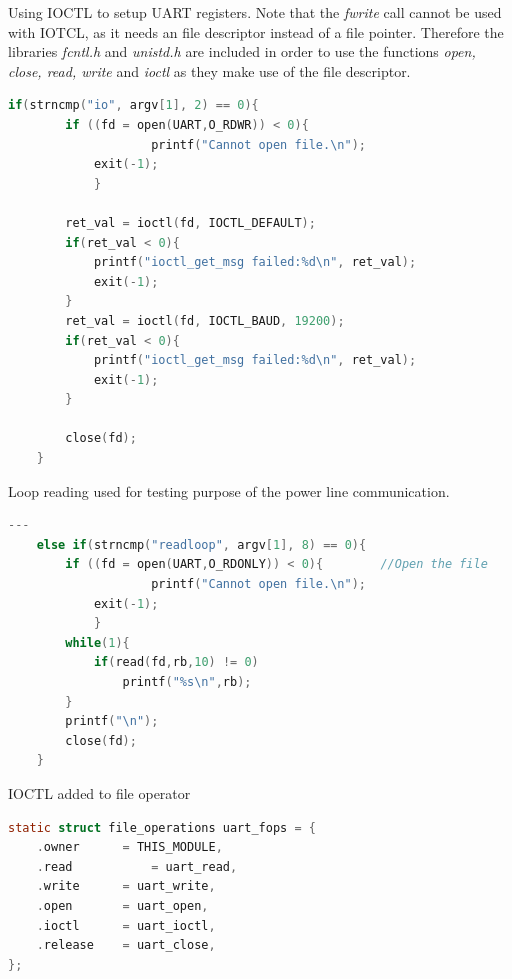 Using IOCTL to setup UART registers. Note that the \textit{fwrite} call cannot be used with IOTCL, as it needs an file descriptor instead of a file pointer. Therefore the libraries \textit{fcntl.h} and \textit{unistd.h} are included in order to use the functions \textit{open, close, read, write} and \textit{ioctl} as they make use of the file descriptor. 
\begin{lstlisting}[language=c]
	if(strncmp("io", argv[1], 2) == 0){
		if ((fd = open(UART,O_RDWR)) < 0){
     	          	printf("Cannot open file.\n");
			exit(-1);
        	}

		ret_val = ioctl(fd, IOCTL_DEFAULT);
		if(ret_val < 0){
			printf("ioctl_get_msg failed:%d\n", ret_val);
			exit(-1);
		}
		ret_val = ioctl(fd, IOCTL_BAUD, 19200);
		if(ret_val < 0){
			printf("ioctl_get_msg failed:%d\n", ret_val);
			exit(-1);
		}

		close(fd);
	}
\end{lstlisting}
Loop reading used for testing purpose of the power line communication. 
\begin{lstlisting}[language=c]
	---
	else if(strncmp("readloop", argv[1], 8) == 0){
		if ((fd = open(UART,O_RDONLY)) < 0){		//Open the file
     	          	printf("Cannot open file.\n");
			exit(-1);
        	}
		while(1){
			if(read(fd,rb,10) != 0) 
				printf("%s\n",rb);
		}
		printf("\n");
		close(fd);
	}
\end{lstlisting}

IOCTL added to file operator
\begin{lstlisting}[language=c]
static struct file_operations uart_fops = {
	.owner   	= THIS_MODULE,
	.read			= uart_read,
	.write  	= uart_write,
	.open    	= uart_open,
	.ioctl	 	= uart_ioctl,
	.release 	= uart_close,
};
\end{lstlisting}

